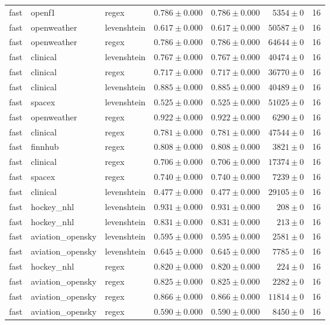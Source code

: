 \begin{table}[htbp]
\begin{tabular}{l l l r r r r}
fast & openf1 & regex & $0.786\pm0.000$ & $0.786\pm0.000$ & $5354\pm0$ & 16 \\
fast & openweather & levenshtein & $0.617\pm0.000$ & $0.617\pm0.000$ & $50587\pm0$ & 16 \\
fast & openweather & regex & $0.786\pm0.000$ & $0.786\pm0.000$ & $64644\pm0$ & 16 \\
fast & clinical & levenshtein & $0.767\pm0.000$ & $0.767\pm0.000$ & $40474\pm0$ & 16 \\
fast & clinical & regex & $0.717\pm0.000$ & $0.717\pm0.000$ & $36770\pm0$ & 16 \\
fast & clinical & levenshtein & $0.885\pm0.000$ & $0.885\pm0.000$ & $40489\pm0$ & 16 \\
fast & spacex & levenshtein & $0.525\pm0.000$ & $0.525\pm0.000$ & $51025\pm0$ & 16 \\
fast & openweather & regex & $0.922\pm0.000$ & $0.922\pm0.000$ & $6290\pm0$ & 16 \\
fast & clinical & regex & $0.781\pm0.000$ & $0.781\pm0.000$ & $47544\pm0$ & 16 \\
fast & finnhub & regex & $0.808\pm0.000$ & $0.808\pm0.000$ & $3821\pm0$ & 16 \\
fast & clinical & regex & $0.706\pm0.000$ & $0.706\pm0.000$ & $17374\pm0$ & 16 \\
fast & spacex & regex & $0.740\pm0.000$ & $0.740\pm0.000$ & $7239\pm0$ & 16 \\
fast & clinical & levenshtein & $0.477\pm0.000$ & $0.477\pm0.000$ & $29105\pm0$ & 16 \\
fast & hockey\_nhl & levenshtein & $0.931\pm0.000$ & $0.931\pm0.000$ & $208\pm0$ & 16 \\
fast & hockey\_nhl & levenshtein & $0.831\pm0.000$ & $0.831\pm0.000$ & $213\pm0$ & 16 \\
fast & aviation\_opensky & levenshtein & $0.595\pm0.000$ & $0.595\pm0.000$ & $2581\pm0$ & 16 \\
fast & aviation\_opensky & levenshtein & $0.645\pm0.000$ & $0.645\pm0.000$ & $7785\pm0$ & 16 \\
fast & hockey\_nhl & regex & $0.820\pm0.000$ & $0.820\pm0.000$ & $224\pm0$ & 16 \\
fast & aviation\_opensky & regex & $0.825\pm0.000$ & $0.825\pm0.000$ & $2282\pm0$ & 16 \\
fast & aviation\_opensky & regex & $0.866\pm0.000$ & $0.866\pm0.000$ & $11814\pm0$ & 16 \\
fast & aviation\_opensky & regex & $0.590\pm0.000$ & $0.590\pm0.000$ & $8450\pm0$ & 16 \\

\end{tabular}
\end{table}
